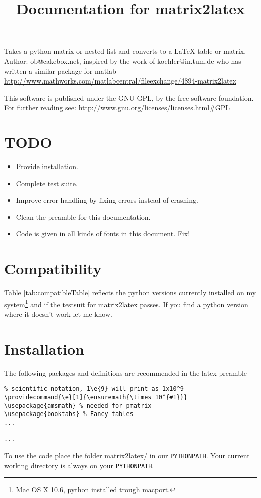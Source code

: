 
\title{Documentation for matrix2latex}


\maketitle
Takes a python matrix or nested list and converts to a LaTeX table or matrix.
Author: ob@cakebox.net, inspired by the work of koehler@in.tum.de who has written
a similar package for matlab
\url{http://www.mathworks.com/matlabcentral/fileexchange/4894-matrix2latex}

This software is published under the GNU GPL, by the free software
foundation. For further reading see: 
\url{http://www.gnu.org/licenses/licenses.html#GPL}

\section{TODO}
\begin{itemize}
\item Provide installation.
\item Complete test suite.
\item Improve error handling by fixing errors instead of crashing.
\item Clean the preamble for this documentation.
\item Code is given in all kinds of fonts in this document. Fix!
\end{itemize}

\section{Compatibility}
Table \ref{tab:compatibleTable} reflects the python versions currently installed
on my system\footnote{Mac OS X 10.6, python installed trough macport.}
and if the testsuit for matrix2latex passes. If you find a python version where
it doesn't work let me know.


\section{Installation}
The following packages and definitions are recommended in the latex preamble 
\begin{verbatim}
% scientific notation, 1\e{9} will print as 1x10^9
\providecommand{\e}[1]{\ensuremath{\times 10^{#1}}}
\usepackage{amsmath} % needed for pmatrix
\usepackage{booktabs} % Fancy tables
...

...
\end{verbatim}
To use the code place the folder matrix2latex/ in our \verb!PYTHONPATH!.
Your current working directory is always on your \verb!PYTHONPATH!.

